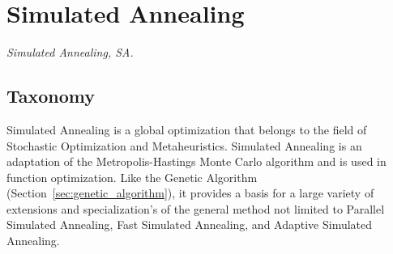 

\section{Simulated Annealing} 
\label{sec:simulated_annealing}

\emph{Simulated Annealing, SA.}

\subsection{Taxonomy}
Simulated Annealing is a global optimization that belongs to the field of Stochastic Optimization and Metaheuristics.
Simulated Annealing is an adaptation of the Metropolis-Hastings Monte Carlo algorithm and is used in function optimization. Like the Genetic Algorithm (Section~\ref{sec:genetic_algorithm}), it provides a basis for a large variety of extensions and specialization's of the general method not limited to Parallel Simulated Annealing, Fast Simulated Annealing, and Adaptive Simulated Annealing.

